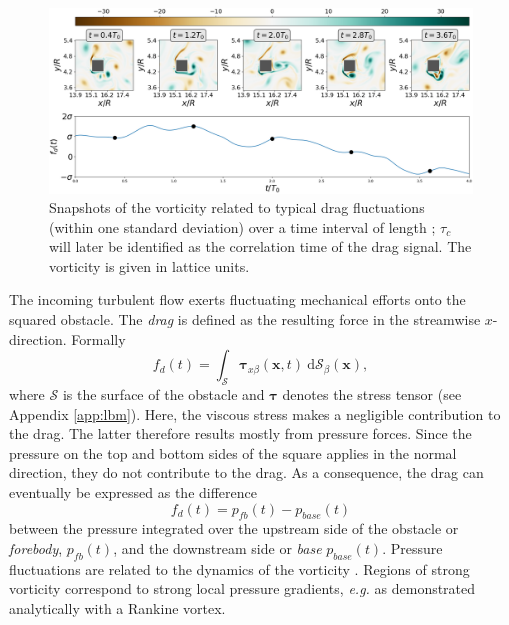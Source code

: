 \documentclass{jfm}
\newcommand{\EL}[1]{{\color{myred}{#1}}}
\begin{document}
\begin{figure}
	\centering
	\includegraphics[width=\linewidth]{ecoulement_typique/ecoulement_typique.png}
	\caption{Snapshots of the vorticity related to typical drag fluctuations (within one standard deviation) over a time interval of length \EL{$\tau_c \simeq 4T_0$}; $\tau_c$ will later be identified as the correlation time of the drag signal.
		The vorticity is given in lattice units.}
	\label{fig:typical_vorticity}
\end{figure}


%
The incoming turbulent flow exerts fluctuating mechanical efforts onto the squared obstacle.
The \textit{drag} is defined as the resulting force in the streamwise $x$-direction. Formally 
\begin{equation}
\label{eq:drag_definition}
f_d(t) = \int_{\mathcal{S}} \boldsymbol{\tau}_{x \beta}(\mathbf{x},t) ~ \mathrm{d}{\mathcal{S}}_\beta(\mathbf{x}),
\end{equation}
where $\mathcal{S}$ is the surface of the obstacle and $\boldsymbol{\tau}$ denotes the stress tensor (see Appendix \ref{app:lbm}). 
Here, the viscous stress makes a negligible contribution to the drag. The latter therefore results mostly from pressure forces.
%
Since the pressure on the top and bottom sides of the square applies in the normal direction, they do not contribute to the drag. 
As a consequence, the drag can eventually be expressed as the difference 
\begin{equation}
\label{eq:drag_approx}
f_d(t) = p_{fb}(t) - p_{base}(t)
\end{equation}
between the pressure integrated over the upstream side of the obstacle or \textit{forebody}, $p_{fb}(t)$, and the downstream side or \textit{base} $p_{base}(t)$.
Pressure fluctuations are related to the dynamics of the vorticity \EL{field}.
Regions of strong vorticity correspond to strong local pressure gradients, \emph{e.g.} as demonstrated analytically with a Rankine vortex.
%
%
\end{document}

